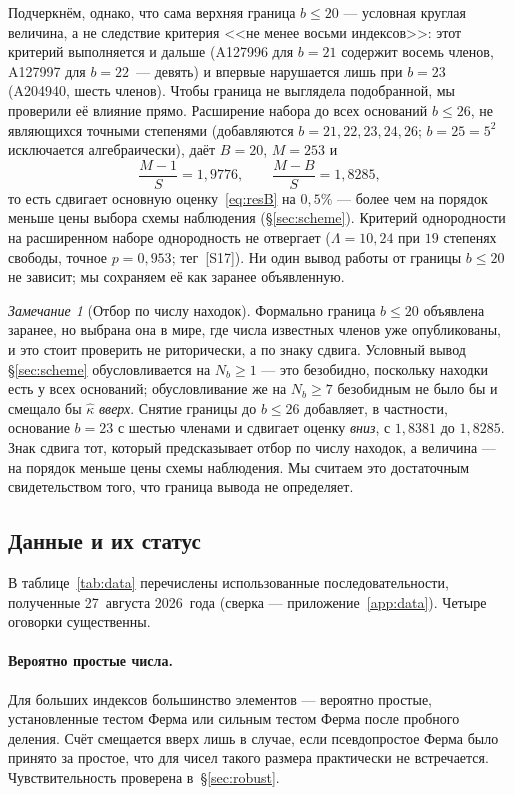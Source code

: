 \documentclass[11pt,a4paper]{article}
\theoremstyle{plain}
\theoremstyle{remark}
\newtheorem{remark}{Замечание}
\begin{document}
Подчеркнём, однако, что сама верхняя граница $b\le20$ --- условная круглая величина,
а не следствие критерия <<не менее восьми индексов>>: этот критерий выполняется и
дальше (A127996 для $b=21$ содержит восемь членов, A127997 для $b=22$~--- девять) и
впервые нарушается лишь при $b=23$ (A204940, шесть членов). Чтобы граница не выглядела
подобранной, мы проверили её влияние прямо. Расширение набора до всех оснований
$b\le26$, не являющихся точными степенями (добавляются $b=21,22,23,24,26$; $b=25=5^2$
исключается алгебраически), даёт $B=20$, $M=253$ и
\[
  \frac{M-1}{S}=1{,}9776,\qquad \frac{M-B}{S}=1{,}8285,
\]
то есть сдвигает основную оценку~\eqref{eq:resB} на $0{,}5\%$ --- более чем на
порядок меньше цены выбора схемы наблюдения (\S\ref{sec:scheme}). Критерий однородности
на расширенном наборе однородность не отвергает
($\Lambda=10{,}24$ при $19$ степенях свободы, точное $p=0{,}953$; тег~[S17]).
Ни один вывод работы от границы $b\le20$ не зависит; мы сохраняем её как заранее
объявленную.

\begin{remark}[Отбор по числу находок]\label{rem:selection}
Формально граница $b\le20$ объявлена заранее, но выбрана она в мире, где числа
известных членов уже опубликованы, и это стоит проверить не риторически, а по
знаку сдвига. Условный вывод \S\ref{sec:scheme} обусловливается на $N_b\ge1$ ---
это безобидно, поскольку находки есть у всех оснований; обусловливание же на
$N_b\ge7$ безобидным не было бы и смещало бы $\hat\kappa$ \emph{вверх}. Снятие
границы до $b\le26$ добавляет, в частности, основание $b=23$ с шестью членами и
сдвигает оценку \emph{вниз}, с $1{,}8381$ до $1{,}8285$. Знак сдвига тот, который
предсказывает отбор по числу находок, а величина --- на порядок меньше цены
схемы наблюдения. Мы считаем это достаточным свидетельством того, что граница
вывода не определяет.
\end{remark}

\subsection{Данные и их статус}
В таблице~\ref{tab:data} перечислены использованные последовательности,
полученные 27~августа 2026~года (сверка --- приложение~\ref{app:data}).
Четыре оговорки существенны.

\paragraph{Вероятно простые числа.} Для больших индексов большинство элементов ---
вероятно простые, установленные тестом Ферма или сильным тестом Ферма после пробного
деления. Счёт смещается вверх лишь в случае, если псевдопростое Ферма было принято за
простое, что для чисел такого размера практически не встречается. Чувствительность
проверена в~\S\ref{sec:robust}.
\end{document}
